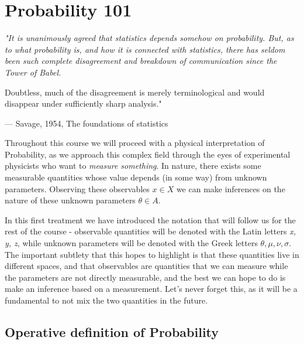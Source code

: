 \chapter{Probability 101}
\label{chap:prob}

\vspace*{2cm}

\begin{center}
	\itshape
	"It is unanimously agreed that statistics
	depends somehow on probability. But, as to
	what probability is, and how it is connected
	with statistics, there has seldom been such
	complete disagreement and breakdown of
	communication since the Tower of Babel.
	
	
	Doubtless, much of the disagreement is
	merely terminological and would disappear
	under sufficiently sharp analysis."
	
	\vspace{0.5em}
	--- Savage, 1954, The foundations of statistics \cite{savage1972introduction}
\end{center}

\vspace{2cm}


Throughout this course we will proceed with a physical interpretation of Probability, as we approach this complex field through the eyes of experimental physicists who want to \emph{measure something}. In nature, there exists some measurable quantities whose value depends (in some way) from unknown parameters. Observing these observables $x\in X$ we can make inferences on the nature of these unknown parameters $\theta\in A$. 

In this first treatment we have introduced the notation that will follow us for the rest of the course - observable quantities will be denoted with the Latin letters \emph{x, y, z}, while unknown parameters will be denoted with the Greek letters \emph{$\theta, \mu, \nu, \sigma$}. The important subtlety that this hopes to highlight is that these quantities live in different spaces, and that observables are quantities that we can measure while the parameters are not directly measurable, and the best we can hope to do is make an inference based on a measurement. Let's never forget this, as it will be a fundamental to not mix the two quantities in the future. 



\section{Operative definition of Probability}
\label{sec:prob_def}


